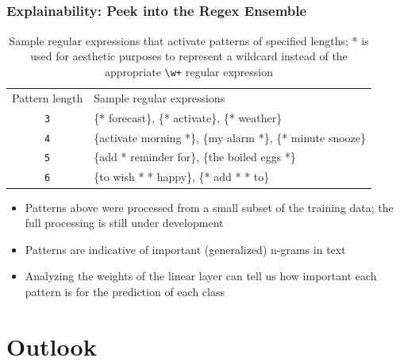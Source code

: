 \documentclass[10pt]{beamer}
\begin{document}
  \subsection{}
	\begin{frame}
		\frametitle{Explainability: Peek into the Regex Ensemble}
    \begin{table}[]
      \begin{tabular}{|c|l|}
        \cline{1-2}
        Pattern length & Sample regular expressions \\ \hhline{|=|=|}
        \texttt{3} & \{* forecast\}, \{* activate\}, \{* weather\} \\ \cline{1-2}
        \texttt{4} & \{activate morning *\}, \{my alarm *\}, \{* minute snooze\} \\ \cline{1-2}
        \texttt{5} & \{add * reminder for\}, \{the boiled eggs *\} \\ \cline{1-2}
        \texttt{6} & \{to wish * * happy\}, \{* add * * to\} \\ \cline{1-2}
      \end{tabular}
      \caption{Sample regular expressions that activate patterns of specified lengths; * is used for aesthetic purposes to represent a wildcard instead of the appropriate \texttt{\textbackslash{}w+} regular expression}
    \end{table}
    \begin{itemize} 
      \item Patterns above were processed from a small subset of the training data; the full processing is still under development
      \item Patterns are indicative of important (generalized) n-grams in text
      \item Analyzing the weights of the linear layer can tell us how important each pattern is for the prediction of each class
    \end{itemize} 
	\end{frame} 

  \section{Outlook}
\end{document}
